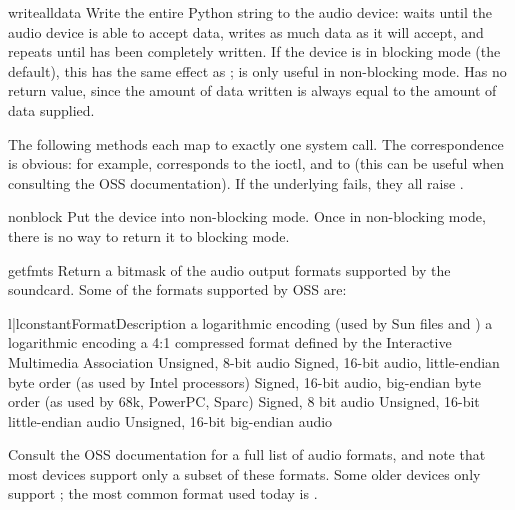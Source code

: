 \begin{methoddesc}{writeall}{data}
Write the entire Python string  to the audio device: waits
until the audio device is able to accept data, writes as much data as it
will accept, and repeats until  has been completely written.
If the device is in blocking mode (the default), this has the same
effect as ;  is only useful in
non-blocking mode.  Has no return value, since the amount of data
written is always equal to the amount of data supplied.
\end{methoddesc}

The following methods each map to exactly one
 system call.  The correspondence is obvious: for
example,  corresponds to the 
ioctl, and  to  (this can be useful
when consulting the OSS documentation).  If the underlying
 fails, they all raise .

\begin{methoddesc}{nonblock}{}
Put the device into non-blocking mode.  Once in non-blocking mode, there
is no way to return it to blocking mode.
\end{methoddesc}

\begin{methoddesc}{getfmts}{}
Return a bitmask of the audio output formats supported by the
soundcard.  Some of the formats supported by OSS are:

\begin{tableii}{l|l}{constant}{Format}{Description}
       {a logarithmic encoding (used by Sun  files and
        )}
       {a logarithmic encoding}
       {a 4:1 compressed format defined by the Interactive Multimedia
        Association} 
       {Unsigned, 8-bit audio}
       {Signed, 16-bit audio, little-endian byte order (as used by
        Intel processors)}
       {Signed, 16-bit audio, big-endian byte order (as used by 68k,
        PowerPC, Sparc)}
       {Signed, 8 bit audio}
       {Unsigned, 16-bit little-endian audio}
       {Unsigned, 16-bit big-endian audio}
\end{tableii}
Consult the OSS documentation for a full list of audio formats, and note
that most devices support only a subset of these formats.  Some older
devices only support ; the most common format used
today is .
\end{methoddesc}

